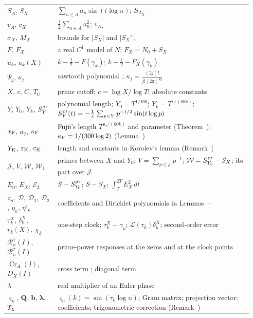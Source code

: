 \documentclass[preprint,12pt]{elsarticle}
\makeatletter
\let\CG@origref\ref
\let\CG@origeqref\eqref
\newcommand{\CG@gettip}[1]{\@ifundefined{CGTip@#1}{Reference: #1}{\csname CGTip@#1\endcsname}}
\DeclareRobustCommand{\CGref}[1]{\pdftooltip{\CG@origref{#1}}{\CG@gettip{#1}}}
\DeclareRobustCommand{\CGeqref}[1]{\pdftooltip{\CG@origeqref{#1}}{\CG@gettip{#1}}}
\numberwithin{equation}{section}
\theoremstyle{plain}
\theoremstyle{definition}
\theoremstyle{remark}
\newcommand{\NO}{N_0}
\newcommand{\lL}{\mathcal L}
\newcommand{\Cr}{\operatorname{Cr}}
\newcommand{\Rg}{\mathcal R^{\gamma}}
\newcommand{\Rt}{\mathcal R^{\tau}}
\makeatother
\begin{document}
\begin{center}
\begin{longtable}{p{}p{}}
$S_A$, $S_X$ & $\sum_{n\in A}a_n\sin(t\log n)$; $S_{A_X}$\\
$v_A$, $v_X$ & $\frac12\sum_{n\in A}a_n^2$; $v_{A_X}$\\
$\sigma_X$, $M_X$ & bounds for $|S_X|$ and $|S_X'|$, \CGeqref{eq:sigma_M_def}\\
$F$, $F_X$ & a real $C^1$ model of $N$; $F_X=\NO+S_X$\\
$u_k$, $u_k(X)$ & $k-\frac12-F(\gamma_k)$; $k-\frac12-F_X(\gamma_k)$\\
$\Psi_j$, $\kappa_j$ & sawtooth polynomial \CGeqref{eq:Psi_def}; $\kappa_j=\frac{(2j)!}{j!(2\pi)^{2j}}$\\
$X$, $c$, $C$, $T_0$ & prime cutoff; $c=\log X/\log T$; absolute constants\\
$Y$, $Y_0$, $Y_k$, $S^{\rm pr}_Y$ & polynomial length; $Y_0=T^{1/160}$; $Y_k=T^{1/(80k)}$; $S^{\rm pr}_Y(t)=-\frac1\pi\sum_{p<Y}p^{-1/2}\sin(t\log p)$\\
$x_{\rm F}$, $a_2$, $\kappa_{\rm F}$ & Fujii's length $T^{a_2/(60k)}$ and parameter (Theorem~\CGref{thm:known_fujii_selberg}); $\kappa_{\rm F}=1/(300\log2)$ (Lemma~\CGref{lem:selberg_uniform})\\
$Y_{\rm K}$, $\varepsilon_{\rm K}$, $c_{\rm K}$ & length and constants in Korolev's lemma (Remark~\CGref{rem:korolev_uniform})\\
$\mathcal J$, $V$, $\mathcal W$, $\mathcal W_1$ & primes between $X$ and $Y_0$; $V=\sum_{p\in\mathcal J}p^{-1}$; $\mathcal W=S^{\rm pr}_{Y_0}-S_X$; its part over $\mathcal J$ \CGeqref{eq:D_def}\\
$E_0$, $E_X$, $\mathcal E_2$ & $S-S^{\rm pr}_{Y_0}$; $S-S_X$; $\int_T^{2T}E_X^2\,dt$\\
$z_n$, $\mathcal D$, $\mathcal D_1$, $\mathcal D_2$, $\eta_n$, $\eta'_n$ & coefficients and Dirichlet polynomials in Lemmas~\CGref{lem:trig_MV}--\CGref{lem:D_moments}\\
$\tau_k^X$, $\delta_k^X$, $r_k(X)$, $\chi_k$ & one-step clock; $\tau_k^X-\gamma_k$; $\lL(\tau_k)\delta_k^X$; second-order error \CGeqref{eq:one_step_decomposition}\\
$\Rg_n(I)$, $\Rt_n(I)$ & prime-power responses at the zeros and at the clock points \CGeqref{eq:two_responses}\\
$\Cr_A(I)$, $D_X(I)$ & cross term \CGeqref{eq:Cr_def}; diagonal term \CGeqref{eq:full_factor_gain}\\
$\lambda$ & real multiplier of an Euler phase\\
$\varsigma_n$, $\mathbf Q$, $\mathbf b$, $\boldsymbol\lambda$, $\Upsilon_{\boldsymbol\lambda}$ & $\varsigma_n(k)=\sin(\tau_k\log n)$; Gram matrix; projection vector; coefficients; trigonometric correction (Remark~\CGref{rem:matrix_projection})\\

\end{longtable}
\end{center}
\end{document}
